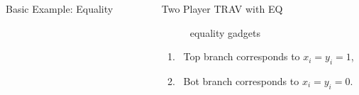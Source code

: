 \documentclass[final]{beamer}
\newlength{\sepwid}
\newlength{\onecolwid}
\newlength{\twocolwid}
\begin{document}
\begin{frame}[t]
\begin{columns}[t]
\begin{column}{\onecolwid}
\begin{block}{Basic Example: Equality}
\end{block}



\end{column} %

\begin{column}{\sepwid}\end{column} %

\begin{column}{\twocolwid} %

\begin{columns}[t,totalwidth=\twocolwid] %

\begin{column}{\onecolwid}\vspace{-.6in} %


\begin{block}{Two Player TRAV with EQ}


\begin{figure}[H]
\centering
{}
\caption{equality gadgets}
\label{fig:equality-gadget-chain}
\end{figure}


\begin{enumerate}
    \item \ Top branch corresponds to $x_i = y_i = 1$, 
    \item \ Bot branch corresponds to $x_i = y_i = 0$. 
\end{enumerate}
\textbf{  }


\end{block}
\end{column}
\end{columns}
\end{column}
\end{columns}
\end{frame}
\end{document}
